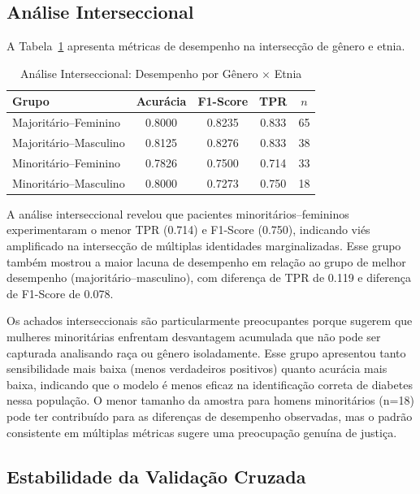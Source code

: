 \subsection{Análise Interseccional}

A Tabela~\ref{tab:intersectional} apresenta métricas de desempenho na 
intersecção de gênero e etnia.

\begin{table}[H]
\centering
\caption{Análise Interseccional: Desempenho por Gênero $\times$ Etnia}
\begin{tabular}{lcccc}
\toprule
\textbf{Grupo} & \textbf{Acurácia} & \textbf{F1-Score} & 
\textbf{TPR} & \textbf{$n$} \\
\midrule
Majoritário--Feminino & 0.8000 & 0.8235 & 0.833 & 65 \\
Majoritário--Masculino & 0.8125 & 0.8276 & 0.833 & 38 \\
Minoritário--Feminino & 0.7826 & 0.7500 & 0.714 & 33 \\
Minoritário--Masculino & 0.8000 & 0.7273 & 0.750 & 18 \\
\bottomrule
\end{tabular}
\label{tab:intersectional}
\end{table}

A análise interseccional revelou que pacientes minoritários--femininos 
experimentaram o menor TPR (0.714) e F1-Score (0.750), indicando viés 
amplificado na intersecção de múltiplas identidades marginalizadas. 
Esse grupo também mostrou a maior lacuna de desempenho em relação ao 
grupo de melhor desempenho (majoritário--masculino), com diferença de 
TPR de 0.119 e diferença de F1-Score de 0.078.

Os achados interseccionais são particularmente preocupantes porque 
sugerem que mulheres minoritárias enfrentam desvantagem acumulada que 
não pode ser capturada analisando raça ou gênero isoladamente. Esse 
grupo apresentou tanto sensibilidade mais baixa (menos verdadeiros 
positivos) quanto acurácia mais baixa, indicando que o modelo é menos 
eficaz na identificação correta de diabetes nessa população. O menor 
tamanho da amostra para homens minoritários (n=18) pode ter contribuído 
para as diferenças de desempenho observadas, mas o padrão consistente 
em múltiplas métricas sugere uma preocupação genuína de justiça.

\subsection{Estabilidade da Validação Cruzada}

